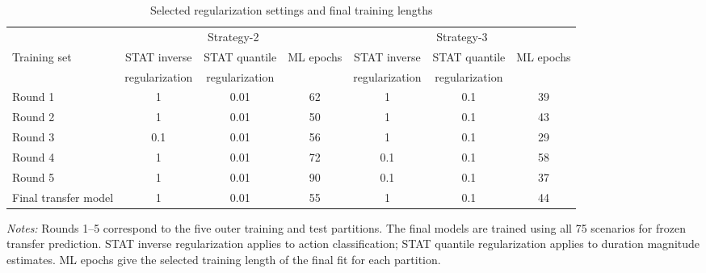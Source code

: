 \begin{table}[htbp]
\centering
\caption{Selected regularization settings and final training lengths}
\small
\setlength{\tabcolsep}{4pt}
\begin{tabular*}{\linewidth}{@{\extracolsep{\fill}}lcccccc@{}}
\toprule
 & \multicolumn{3}{c}{Strategy-2} & \multicolumn{3}{c}{Strategy-3} \\
\cmidrule(lr){2-4}\cmidrule(lr){5-7}
Training set & STAT inverse & STAT quantile & ML epochs & STAT inverse & STAT quantile & ML epochs \\
 & regularization & regularization & & regularization & regularization & \\
\midrule
Round 1 & 1 & 0.01 & 62 & 1 & 0.1 & 39 \\
Round 2 & 1 & 0.01 & 50 & 1 & 0.1 & 43 \\
Round 3 & 0.1 & 0.01 & 56 & 1 & 0.1 & 29 \\
Round 4 & 1 & 0.01 & 72 & 0.1 & 0.1 & 58 \\
Round 5 & 1 & 0.01 & 90 & 0.1 & 0.1 & 37 \\
Final transfer model & 1 & 0.01 & 55 & 1 & 0.1 & 44 \\
\bottomrule
\end{tabular*}
\par\vspace{3pt}
\begin{minipage}{\linewidth}\footnotesize
\textit{Notes:} Rounds 1--5 correspond to the five outer training and test partitions. The final models are trained using all 75 scenarios for frozen transfer prediction. STAT inverse regularization applies to action classification; STAT quantile regularization applies to duration magnitude estimates. ML epochs give the selected training length of the final fit for each partition.
\end{minipage}
\end{table}
\endgroup
